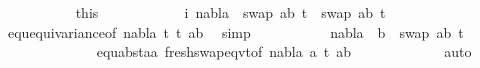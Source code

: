 \begin{isabellebody}
\ \ \ \ \ \ \ \ \ \isamarkupfalse%
\ this{\isacharparenleft}{\kern0pt}{}{\isacharparenright}{\kern0pt}\ {}{\isacharparenleft}{\kern0pt}{}{\isacharparenright}{\kern0pt}\isanewline
\ \ \ \ \ \ \ \ \ \isamarkupfalse%
\ i{\isacharcolon}{\kern0pt}\ {\isachardoublequoteopen}nabla\ {\isasymturnstile}\ swap\ {\isacharbrackleft}{\kern0pt}{\isacharparenleft}{\kern0pt}a{\isacharcomma}{\kern0pt}b{\isacharparenright}{\kern0pt}{\isacharbrackright}{\kern0pt}\ t{}{\isacharprime}{\kern0pt}\ {\isasymapprox}\ swap\ {\isacharbrackleft}{\kern0pt}{\isacharparenleft}{\kern0pt}a{\isacharcomma}{\kern0pt}b{\isacharparenright}{\kern0pt}{\isacharbrackright}{\kern0pt}\ t{}{\isacharprime}{\kern0pt}{\isachardoublequoteclose}\isanewline
\ \ \ \ \ \ \ \ \ \ \ \isamarkupfalse%
\ equ{\isacharunderscore}{\kern0pt}equivariance{\isacharbrackleft}{\kern0pt}of\ nabla\ t{}{\isacharprime}{\kern0pt}\ t{}{\isacharprime}{\kern0pt}\ {\isacartoucheopen}{\isacharbrackleft}{\kern0pt}{\isacharparenleft}{\kern0pt}a{\isacharcomma}{\kern0pt}b{\isacharparenright}{\kern0pt}{\isacharbrackright}{\kern0pt}{\isacartoucheclose}{\isacharbrackright}{\kern0pt}\ \isamarkupfalse%
\ simp\isanewline
\isanewline
\ \ \ \ \ \ \ \ \ \isamarkupfalse%
\ {\isachardoublequoteopen}nabla\ {\isasymturnstile}\ b\ {\isasymsharp}\ swap\ {\isacharbrackleft}{\kern0pt}{\isacharparenleft}{\kern0pt}a{\isacharcomma}{\kern0pt}b{\isacharparenright}{\kern0pt}{\isacharbrackright}{\kern0pt}\ t{}{\isacharprime}{\kern0pt}{\isachardoublequoteclose}\ \isanewline
\ \ \ \ \ \ \ \ \ \ \ \isamarkupfalse%
\ {}{\isacharparenleft}{\kern0pt}{}{\isacharcomma}{\kern0pt}{}{\isacharcomma}{\kern0pt}{}{\isacharcomma}{\kern0pt}{}{\isacharparenright}{\kern0pt}\ equ{\isacharunderscore}{\kern0pt}abst{\isacharunderscore}{\kern0pt}aa{\isacharparenleft}{\kern0pt}{}{\isacharparenright}{\kern0pt}\ fresh{\isacharunderscore}{\kern0pt}swap{\isacharunderscore}{\kern0pt}eqvt{\isacharbrackleft}{\kern0pt}of\ nabla\ a\ t{}{\isacharprime}{\kern0pt}\ {\isacartoucheopen}{\isacharbrackleft}{\kern0pt}{\isacharparenleft}{\kern0pt}a{\isacharcomma}{\kern0pt}b{\isacharparenright}{\kern0pt}{\isacharbrackright}{\kern0pt}{\isacartoucheclose}{\isacharbrackright}{\kern0pt}\isanewline
\ \ \ \ \ \ \ \ \ \ \ \isamarkupfalse%
\ auto\isanewline
\ \ \ \ \ \ \ \ \ \isamarkupfalse%
\ \isamarkupfalse%

\end{isabellebody}
